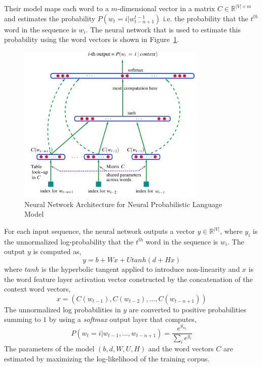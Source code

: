 Their model maps each word to a $m$-dimensional vector in a matrix $C \in \mathbb{R}^{|V|\times m}$ and estimates the probability $P(w_{t} = i|w_{t-n+1}^{t-1})$ i.e. the probability that the $t^{th}$ word in the sequence is $w_{i}$. The neural network that is used to estimate this probability using the word vectors is shown in Figure~\ref{fig:nn:bengio}.
\begin{figure}[t!]
    \centering
        \includegraphics[width=0.8\textwidth]{figs/bengio_nn.png}
    \caption{Neural Network Architecture for Neural Probabilistic Language Model}
    \label{fig:nn:bengio}
\end{figure}
For each input sequence, the neural network outputs a vector $y \in \mathbb{R}^{|V|}$, where $y_{i}$ is the unnormalized log-probability that the $t^{th}$ word in the sequence is $w_{i}$. 
The output $y$ is computed as,
\begin{equation}
y = b + Wx + Utanh(d + Hx)
\end{equation}
where $tanh$ is the hyperbolic tangent applied to introduce non-linearity and $x$ is the word feature layer activation vector constructed by the concatenation of the context word vectors,
\begin{equation}
x = (C(w_{t-1}), C(w_{t-2}), \ldots, C(w_{t-n+1}))
\end{equation}
The unnormalized log probabilities in $y$ are converted to positive probabilities summing to $1$ by using a \emph{softmax} output layer that computes, 
\begin{equation}
P(w_{t} = i | w_{t-1}, \ldots, w_{t-n+1}) = \frac{e^{y_{w_t}}}{\sum_{i}e^{y_{i}}}
\end{equation}
The parameters of the model $(b, d, W, U, H)$ and the word vectors $C$ are estimated by maximizing the log-likelihood of the training corpus.


